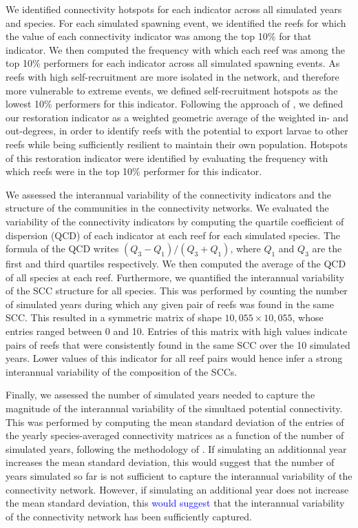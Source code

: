 \documentclass[preprint,12pt,authoryear]{elsarticle}
\newcommand{\modif}[1]{\textcolor{blue}{#1}}
\begin{document}
	We identified connectivity hotspots for each indicator across all simulated years and species. For each simulated spawning event, we identified the reefs for which the value of each connectivity indicator was among the top 10\% for that indicator. We then computed the frequency with which each reef was among the top 10\% performers for each indicator across all simulated spawning events. As reefs with high self-recruitment are more isolated in the network, and therefore more vulnerable to extreme events, we defined self-recruitment hotspots as the lowest 10\% performers for this indicator. Following the approach of \cite{tnc2024}, we defined our restoration indicator as a weighted geometric average of the weighted in- and out-degrees, in order to identify reefs with the potential to export larvae to other reefs while being sufficiently resilient to maintain their own population. Hotspots of this restoration indicator were identified by evaluating the frequency with which reefs were in the top 10\% performer for this indicator.
	
	We assessed the interannual variability of the connectivity indicators and the structure of the communities in the connectivity networks. We evaluated the variability of the connectivity indicators by computing the quartile coefficient of dispersion (QCD) of each indicator at each reef for each simulated species. The formula of the QCD writes $(Q_3-Q_1) / (Q_3+Q_1)$, where $Q_1$ and $Q_3$ are the first and third quartiles respectively. We then computed the average of the QCD of all species at each reef. Furthermore, we quantified the interannual variability of the SCC structure for all species. This was performed by counting the number of simulated years during which any given pair of reefs was found in the same SCC. This resulted in a symmetric matrix of shape $10,055 \times 10,055$, whose entries ranged between 0 and 10. Entries of this matrix with high values indicate pairs of reefs that were consistently found in the same SCC over the 10 simulated years. Lower values of this indicator for all reef pairs would hence infer a strong interannual variability of the composition of the SCCs.
	
	Finally, we assessed the number of simulated years needed to capture the magnitude of the interannual variability of the simultaed potential connectivity. This was performed by computing the mean standard deviation of the entries of the yearly species-averaged connectivity matrices as a function of the number of simulated years, following the methodology of \cite{thompson2018variability}. If simulating an additionnal year increases the mean standard deviation, this would suggest that the number of years simulated so far is not sufficient to capture the interannual variability of the connectivity network. However, if simulating an additional year does not increase the mean standard deviation, this \modif{would suggest} that the interannual variability of the connectivity network has been sufficiently captured.
	
\end{document}
